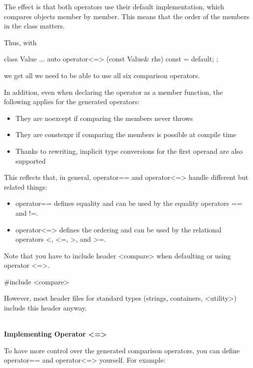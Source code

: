 The effect is that both operators use their default implementation, which compares objects member by member. This means that the order of the members in the class matters.

Thus, with

\begin{cpp}
class Value {
	...
	auto operator<=> (const Value& rhs) const = default;
};
\end{cpp}

we get all we need to be able to use all six comparison operators.

In addition, even when declaring the operator as a member function, the following applies for the generated operators:

\begin{itemize}
\item
They are noexcept if comparing the members never throws

\item
They are constexpr if comparing the members is possible at compile time

\item
Thanks to rewriting, implicit type conversions for the first operand are also supported
\end{itemize}

This reflects that, in general, operator== and operator<=> handle different but related things:

\begin{itemize}
\item
operator== defines equality and can be used by the equality operators == and !=.

\item
operator<=> defines the ordering and can be used by the relational operators <, <=, >, and >=.
\end{itemize}

Note that you have to include header <compare> when defaulting or using operator <=>.

\begin{cpp}
#include <compare>
\end{cpp}

However, most header files for standard types (strings, containers, <utility>) include this header anyway.

\noindent
\hspace*{\fill} \\ %
\textbf{Implementing Operator <=>}

To have more control over the generated comparison operators, you can define operator== and operator<=> yourself. For example:

